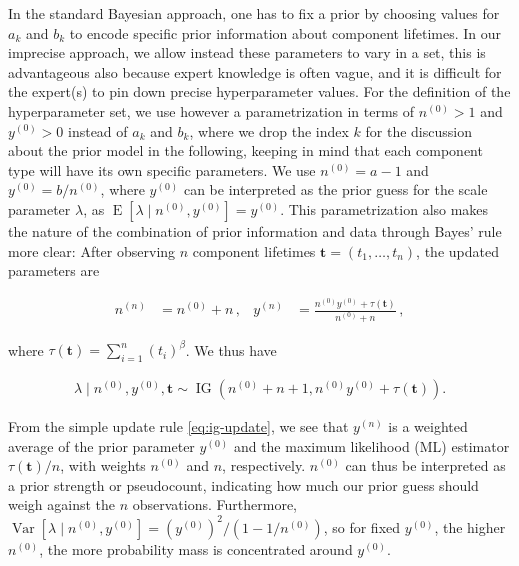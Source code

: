 \documentclass[Journal,SectionNumbers,InsideFigs]{ascelike}
\renewcommand{\vec}[1]{{\bm#1}}
\newcommand{\uz}{^{(0)}} %
\newcommand{\un}{^{(n)}} %
\newcommand{\E}{\operatorname{E}}
\newcommand{\V}{\operatorname{Var}}
\newcommand{\ig}{\operatorname{IG}}   %
\def\yz{y\uz}
\def\yn{y\un}
\def\ykz{y\uz_k}
\def\nz{n\uz}
\def\nn{n\un}
\def\nkz{n\uz_k}
\def\taut{\tau(\vec{t})}
\begin{document}
In the standard Bayesian approach, 
one has to fix a prior by choosing values for $a_k$ and $b_k$
to encode specific prior information about component lifetimes.
In our imprecise approach, we allow instead these parameters
to vary in a set, this is advantageous also
because expert knowledge is often vague,
and it is difficult for the expert(s) to pin down precise hyperparameter values.
For the definition of the hyperparameter set,
we use however a parametrization in terms of $\nz > 1$ and $\yz > 0$ instead of $a_k$ and $b_k$,
where we drop the index $k$ for the discussion about the prior model in the following,
keeping in mind that each component type will have its own specific parameters.
We use
$\nz = a - 1$ and
$\yz = b / \nz$,
where $\yz$ can be interpreted as the prior guess for the scale parameter $\lambda$,
as $\E[\lambda\mid\nz,\yz] = \yz$.
This parametrization also makes the nature of the combination
of prior information and data through Bayes' rule more clear:
After observing $n$ component lifetimes $\vec{t} = (t_1, \ldots, t_n)$,
the updated parameters are
\begin{linenomath*}
\begin{align}
\nn &= \nz + n\,, 
&
\yn &=  \frac{\nz \yz + \taut}{\nz + n}\,,
\label{eq:ig-update}
\end{align}
\end{linenomath*}
where $\taut = \sum_{i=1}^n (t_i)^\beta$. %
We thus have
\begin{linenomath*}
\begin{align}
\lambda \mid \nz, \yz, \vec{t} \sim \ig(\nz + n + 1, \nz \yz + \taut). %
\label{eq:ig-update-alpha}
\end{align}
\end{linenomath*}
From the simple update rule \eqref{eq:ig-update}, we see that
$\yn$ is a weighted average of the prior parameter $\yz$ and the maximum likelihood (ML) estimator $\taut/n$,
with weights $\nz$ and $n$, respectively.
$\nz$ can thus be interpreted as a prior strength or pseudocount,
indicating how much our prior guess should weigh against the $n$ observations.
Furthermore, $\V[\lambda\mid\nz,\yz] = (\yz)^2 / (1 - 1/\nz)$,
so for fixed $\yz$, the higher $\nz$,
the more probability mass is concentrated around $\yz$. %
\end{document}
